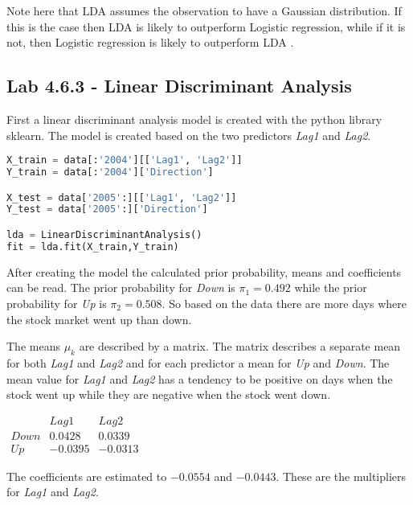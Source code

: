 Note here that LDA assumes the observation to have a Gaussian distribution. If this is the case then LDA is likely to outperform Logistic regression, while if it is not, then Logistic regression is likely to outperform LDA \citep{comparelogandlda}.

\subsection{Lab 4.6.3 - Linear Discriminant Analysis}
First a linear discriminant analysis model is created with the python library sklearn. The model is created based on the two predictors \emph{Lag1} and \emph{Lag2}. 


\begin{lstlisting}[language=Python, label=lst:ldaModel, caption=Creating linear discriminant analysis model sklearn]
X_train = data[:'2004'][['Lag1', 'Lag2']]
Y_train = data[:'2004']['Direction']

X_test = data['2005':][['Lag1', 'Lag2']]
Y_test = data['2005':]['Direction']

lda = LinearDiscriminantAnalysis()
fit = lda.fit(X_train,Y_train)
\end{lstlisting}

After creating the model the calculated prior probability, means and coefficients can be read. The prior probability for \emph{Down} is $\pi_1=0.492$ while the prior probability for \emph{Up} is $\pi_2=0.508$. So based on the data there are more days where the stock market went up than down. 

The means $\mu_k$ are described by a matrix. The matrix describes a separate mean for both \emph{Lag1} and \emph{Lag2} and for each predictor a mean for \emph{Up} and \emph{Down}. The mean value for \emph{Lag1} and \emph{Lag2} has a tendency to be positive on days when the stock went up while they are negative when the stock went down.  

\begin{center}
	$\begin{matrix} 	 & Lag1 & Lag2	\\ 	 Down & 0.0428 & 0.0339 \\ 	 Up & -0.0395 & -0.0313 \end{matrix} $
\end{center}


The coefficients are estimated to $-0.0554$ and $-0.0443$. These are the multipliers for \emph{Lag1} and \emph{Lag2}.

%
%


